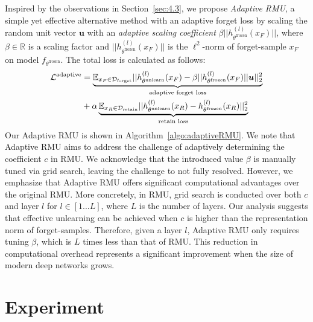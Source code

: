 \documentclass[letterpaper]{article} %
\begin{document}
\noindent Inspired by the observations in Section~\ref{sec:4.3}, we propose \emph{Adaptive RMU}, a simple yet effective alternative method with an adaptive forget loss by scaling the random unit vector $\bm u$ with an \textit{adaptive scaling coefficient} $\beta||h_{\theta^{\text{frozen}}}^{(l)}(x_F)||$, where  $\beta \in \mathbb{R}$ is a scaling factor and $||h_{\theta^{\text{frozen}}}^{(l)}(x_F)||$ is the $\ell^2$-norm of forget-sample $x_F$ on model $f_{\theta^{\text{frozen}}}$. The total loss is calculated as follows:
\begin{align}
    \mathcal{L}^{\textnormal{adaptive}} &= \underbrace{\mathbb{E}_{x_F\in \mathcal{D}_{\text{forget}}}\nonumber||h_{\theta^{\text{unlearn}}}^{(l)}(x_F)-\beta||h_{\theta^{\text{frozen}}}^{(l)}(x_F)|| \bm u||_2^2}_{\textnormal{adaptive forget loss}} \\&+ \alpha\underbrace{\mathbb{E}_{x_R\in \mathcal{D}_{\text{retain}}}||h_{\theta^{\text{unlearn}}}^{(l)}(x_R)-h_{\theta^{\text{frozen}}}^{(l)}(x_R)||_2^2}_{\textnormal{retain loss}}\label{eq8}
\end{align}
Our Adaptive RMU is shown in Algorithm~\ref{algo:adaptiveRMU}. We note that Adaptive RMU aims to address the challenge of adaptively determining the coefficient $c$ in RMU. We acknowledge that the introduced value $\beta$ is manually tuned via grid search, leaving the challenge to not fully resolved. However, we emphasize that Adaptive RMU offers significant computational advantages over the original RMU. More concretely, in RMU, grid search is conducted over both $c$ and layer $l$ for $l \in [1...L]$, where $L$ is the number of layers. Our analysis suggests that effective unlearning can be achieved when $c$ is higher than the representation norm of forget-samples. Therefore, given a layer $l$, Adaptive RMU only requires tuning $\beta$, which is $L$ times less than that of RMU. This reduction in computational overhead represents a significant improvement when the size of modern deep networks grows.



\section{Experiment}
\label{sec:experiment}
\end{document}
